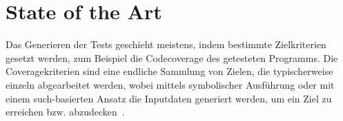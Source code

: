 \documentclass{article}
\begin{document}

\section{State of the Art}
Das Generieren der Tests geschieht meistens, indem bestimmte Zielkriterien gesetzt werden, zum Beispiel die Codecoverage des getesteten Programms. Die Coveragekriterien sind eine endliche Sammlung von Zielen, die typischerweise einzeln abgearbeitet werden, wobei mittels symbolischer Ausführung oder mit einem such-basierten Ansatz die Inputdaten generiert werden, um ein Ziel zu erreichen bzw. abzudecken~\cite{Fraser_2013}. 
\end{document}
